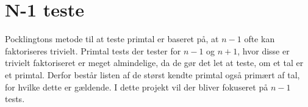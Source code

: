 \documentclass[11pt,a4paper]{article}
\begin{document}

\tableofcontents
\thispagestyle{empty}
\newpage
\setcounter{page}{1}

\section{N-1 teste}
Pocklingtons metode til at teste primtal er baseret på, at $n-1$ ofte kan faktoriseres trivielt. Primtal tests der tester for $n-1$ og $n+1$, hvor 
disse er trivielt faktoriseret er meget almindelige, da de gør det let at teste, om et tal er et primtal. Derfor består listen 
af de størst kendte primtal også primært af tal, for hvilke dette er gældende. I dette projekt vil der bliver fokuseret på $n-1$ tests.






\nocite{*}


\newpage
\appendix
%
\end{document}
